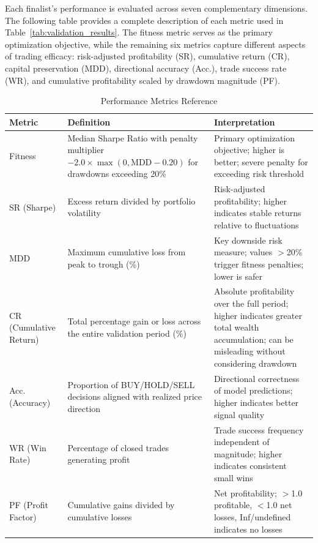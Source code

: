     Each finalist's performance is evaluated across seven complementary dimensions. The following table provides a complete description of each metric used in Table~\ref{tab:validation_results}. The fitness metric serves as the primary optimization objective, while the remaining six metrics capture different aspects of trading efficacy: risk-adjusted profitability (SR), cumulative return (CR), capital preservation (MDD), directional accuracy (Acc.), trade success rate (WR), and cumulative profitability scaled by drawdown magnitude (PF).
    
    \begin{table}[htbp]
    \centering
    \small
    \caption{Performance Metrics Reference}
    \label{tab:metrics_reference}
    \begin{tabular}{|l|p{4cm}|p{4.5cm}|}
    \hline
    \textbf{Metric} & \textbf{Definition} & \textbf{Interpretation} \\
    \hline
    Fitness & Median Sharpe Ratio with penalty multiplier $-2.0 \times \max(0, \text{MDD} - 0.20)$ for drawdowns exceeding 20\% & Primary optimization objective; higher is better; severe penalty for exceeding risk threshold \\
    \hline
    SR (Sharpe) & Excess return divided by portfolio volatility & Risk-adjusted profitability; higher indicates stable returns relative to fluctuations \\
    \hline
    MDD & Maximum cumulative loss from peak to trough (\%) & Key downside risk measure; values $>$20\% trigger fitness penalties; lower is safer \\
    \hline
    CR (Cumulative Return) & Total percentage gain or loss across the entire validation period (\%) & Absolute profitability over the full period; higher indicates greater total wealth accumulation; can be misleading without considering drawdown \\
    \hline
    Acc. (Accuracy) & Proportion of BUY/HOLD/SELL decisions aligned with realized price direction & Directional correctness of model predictions; higher indicates better signal quality \\
    \hline
    WR (Win Rate) & Percentage of closed trades generating profit & Trade success frequency independent of magnitude; higher indicates consistent small wins \\
    \hline
    PF (Profit Factor) & Cumulative gains divided by cumulative losses & Net profitability; $>$1.0 profitable, $<$1.0 net losses, Inf/undefined indicates no losses \\
    \hline
    \end{tabular}
    \end{table}

